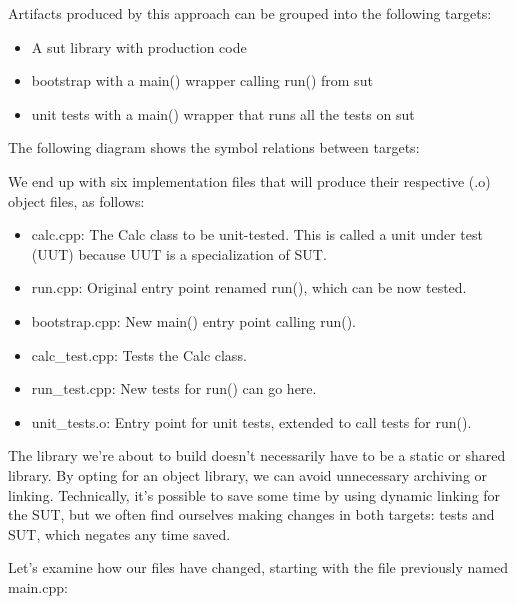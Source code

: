 Artifacts produced by this approach can be grouped into the following targets:

\begin{itemize}
\item
A sut library with production code

\item
bootstrap with a main() wrapper calling run() from sut

\item
unit tests with a main() wrapper that runs all the tests on sut
\end{itemize}

The following diagram shows the symbol relations between targets:


We end up with six implementation files that will produce their respective (.o) object files, as follows:

\begin{itemize}
\item
calc.cpp: The Calc class to be unit-tested. This is called a unit under test (UUT) because UUT is a specialization of SUT.

\item
run.cpp: Original entry point renamed run(), which can be now tested.

\item
bootstrap.cpp: New main() entry point calling run().

\item
calc\_test.cpp: Tests the Calc class.

\item
run\_test.cpp: New tests for run() can go here.

\item
unit\_tests.o: Entry point for unit tests, extended to call tests for run().
\end{itemize}

The library we’re about to build doesn’t necessarily have to be a static or shared library. By opting for an object library, we can avoid unnecessary archiving or linking. Technically, it’s possible to save some time by using dynamic linking for the SUT, but we often find ourselves making changes in both targets: tests and SUT, which negates any time saved.

Let’s examine how our files have changed, starting with the file previously named main.cpp:

